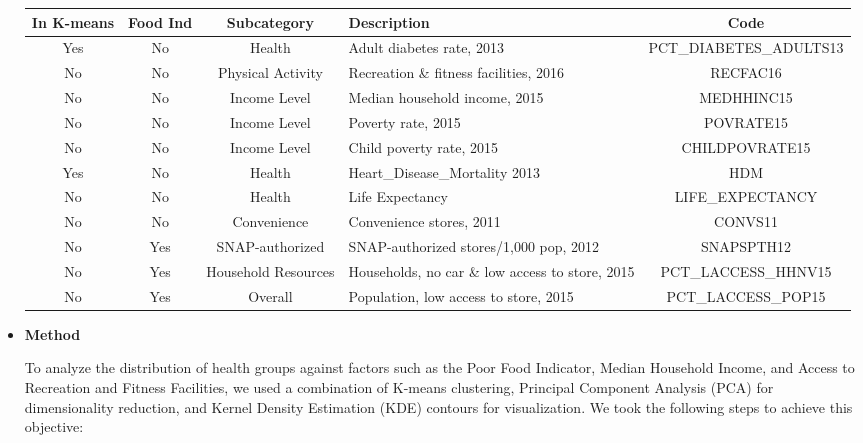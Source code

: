 \documentclass{article}
\begin{document}
\begin{itemize}[leftmargin=0pt]
\begin{tabular}{|c|c|c|p{4cm}|c|}
\hline
\textbf{In K-means} & \textbf{Food Ind} & \textbf{Subcategory}        & \textbf{Description}                          & \textbf{Code}          \\ \hline
Yes                 & No                 & Health                     & Adult diabetes rate, 2013                     & PCT\_DIABETES\_ADULTS13 \\ \hline
No                  & No                 & Physical Activity          & Recreation \& fitness facilities, 2016       & RECFAC16              \\ \hline
No                  & No                 & Income Level               & Median household income, 2015                & MEDHHINC15            \\ \hline
No                  & No                 & Income Level               & Poverty rate, 2015                           & POVRATE15             \\ \hline
No                  & No                 & Income Level               & Child poverty rate, 2015                     & CHILDPOVRATE15        \\ \hline
Yes                 & No                 & Health                     & Heart\_Disease\_Mortality 2013               & HDM                   \\ \hline
No                  & No                 & Health                     & Life Expectancy                              & LIFE\_EXPECTANCY      \\ \hline
No                  & No                 & Convenience                & Convenience stores, 2011                     & CONVS11               \\ \hline
No                  & Yes                & SNAP-authorized            & SNAP-authorized stores/1,000 pop, 2012       & SNAPSPTH12            \\ \hline
No                  & Yes                & Household Resources        & Households, no car \& low access to store, 2015 & PCT\_LACCESS\_HHNV15 \\ \hline
No                  & Yes                & Overall                    & Population, low access to store, 2015        & PCT\_LACCESS\_POP15   \\ \hline
\end{tabular}%

\item[] \textbf{Method}

To analyze the distribution of health groups against factors such as the Poor Food Indicator, Median Household Income, and Access to Recreation and Fitness Facilities, we used a combination of K-means clustering, Principal Component Analysis (PCA) for dimensionality reduction, and Kernel Density Estimation (KDE) contours for visualization. We took the following steps to achieve this objective:


\end{itemize}
\end{document}
